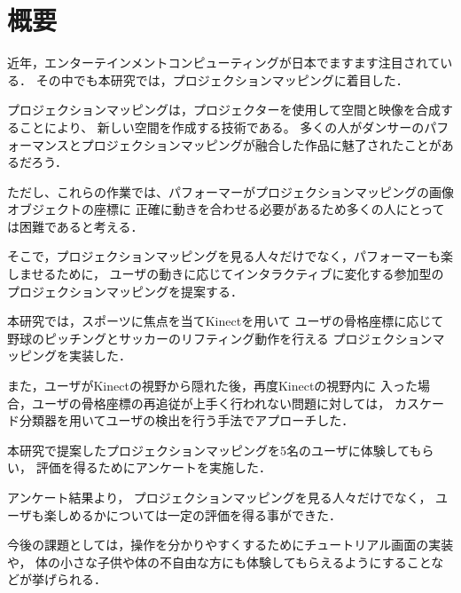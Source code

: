 \chapter*{概要}

近年，エンターテインメントコンピューティングが日本でますます注目されている．
その中でも本研究では，プロジェクションマッピングに着目した．

プロジェクションマッピングは，プロジェクターを使用して空間と映像を合成することにより、
新しい空間を作成する技術である。
多くの人がダンサーのパフォーマンスとプロジェクションマッピングが融合した作品に魅了されたことがあるだろう．

ただし、これらの作業では、パフォーマーがプロジェクションマッピングの画像オブジェクトの座標に
正確に動きを合わせる必要があるため多くの人にとっては困難であると考える．

そこで，プロジェクションマッピングを見る人々だけでなく，パフォーマーも楽しませるために，
ユーザの動きに応じてインタラクティブに変化する参加型のプロジェクションマッピングを提案する．

本研究では，スポーツに焦点を当てKinectを用いて
ユーザの骨格座標に応じて野球のピッチングとサッカーのリフティング動作を行える
プロジェクションマッピングを実装した．

また，ユーザがKinectの視野から隠れた後，再度Kinectの視野内に
入った場合，ユーザの骨格座標の再追従が上手く行われない問題に対しては，
カスケード分類器を用いてユーザの検出を行う手法でアプローチした．

本研究で提案したプロジェクションマッピングを5名のユーザに体験してもらい，
評価を得るためにアンケートを実施した．

アンケート結果より，
プロジェクションマッピングを見る人々だけでなく，
ユーザも楽しめるかについては一定の評価を得る事ができた．

今後の課題としては，操作を分かりやすくするためにチュートリアル画面の実装や，
体の小さな子供や体の不自由な方にも体験してもらえるようにすることなどが挙げられる．